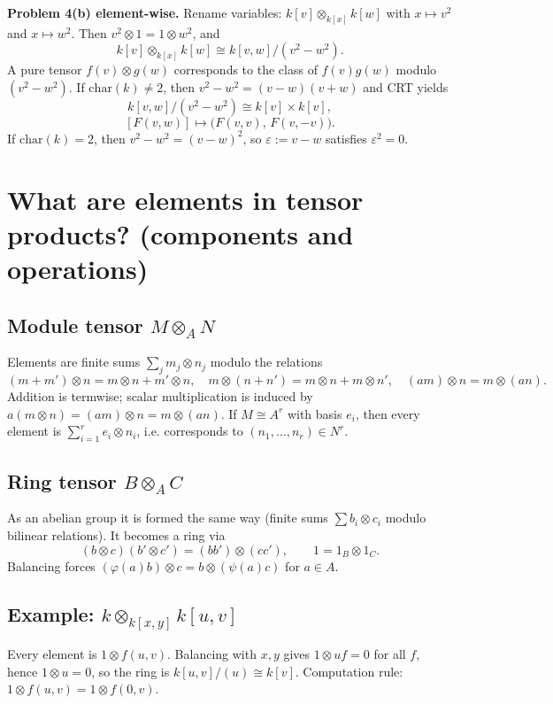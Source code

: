 \documentclass[12pt,a4paper]{article}
\theoremstyle{plain}
\theoremstyle{definition}      %
\begin{document}
 
 
 \textbf{Problem 4(b) element-wise.}
 Rename variables: \(k[v]\otimes_{k[x]}k[w]\) with \(x\mapsto v^2\) and \(x\mapsto w^2\).
 Then \(v^2\otimes 1=1\otimes w^2\), and
 \[
 k[v]\otimes_{k[x]}k[w]\cong k[v,w]/(v^2-w^2).
 \]
 A pure tensor \(f(v)\otimes g(w)\) corresponds to the class of \(f(v)g(w)\) modulo \((v^2-w^2)\).
 If \(\mathrm{char}(k)\neq 2\), then \(v^2-w^2=(v-w)(v+w)\) and CRT yields
 \[
 k[v,w]/(v^2-w^2)\cong k[v]\times k[v],
 \]
\[
[F(v,w)]\longmapsto \bigl(F(v,v),\,F(v,-v)\bigr).
\]
If \(\mathrm{char}(k)=2\), then \(v^2-w^2=(v-w)^2\), so \(\varepsilon:=v-w\) satisfies \(\varepsilon^2=0\).
 
	
	\section*{What are elements in tensor products? (components and operations)}
	
	\subsection*{Module tensor \(M\otimes_A N\)}
	Elements are finite sums \(\sum_j m_j\otimes n_j\) modulo the relations
	\[
	(m+m')\otimes n=m\otimes n+m'\otimes n,\quad
	m\otimes(n+n')=m\otimes n+m\otimes n',\quad
	(am)\otimes n=m\otimes (an).
	\]
	Addition is termwise; scalar multiplication is induced by \(a(m\otimes n)=(am)\otimes n=m\otimes(an)\).
	If \(M\cong A^r\) with basis \(e_i\), then every element is \(\sum_{i=1}^r e_i\otimes n_i\), i.e. corresponds to
	\((n_1,\dots,n_r)\in N^r\).
	
	\subsection*{Ring tensor \(B\otimes_A C\)}
	As an abelian group it is formed the same way (finite sums \(\sum b_i\otimes c_i\) modulo bilinear relations).
	It becomes a ring via
	\[
	(b\otimes c)(b'\otimes c')=(bb')\otimes (cc'),\qquad 1=1_B\otimes 1_C.
	\]
	Balancing forces \((\varphi(a)b)\otimes c=b\otimes(\psi(a)c)\) for \(a\in A\).
	
	\subsection*{Example: \(k\otimes_{k[x,y]}k[u,v]\)}
	Every element is \(1\otimes f(u,v)\). Balancing with \(x,y\) gives \(1\otimes uf=0\) for all \(f\), hence \(1\otimes u=0\),
	so the ring is \(k[u,v]/(u)\cong k[v]\). Computation rule: \(1\otimes f(u,v)=1\otimes f(0,v)\).
	
\end{document}
